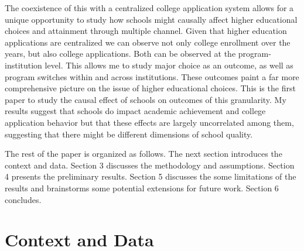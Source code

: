 \documentclass[12pt]{article}
\begin{document}
The coexistence of this with a centralized college application system  allows for a unique opportunity to study how schools might causally affect higher educational choices and attainment through multiple channel. Given that higher education applications are centralized we can observe not only college enrollment over the years, but also college applications. Both can be observed at the program-institution level. This allows me to study major choice as an outcome, as well as program switches within and across institutions. These outcomes paint a far more comprehensive picture on the issue of higher educational choices. This is the first paper to study the causal effect of schools on outcomes of this granularity. My results suggest that schools do impact academic achievement and college application behavior but that these effects are largely uncorrelated among them, suggesting that there might be different dimensions of school quality. 


The rest of the paper is organized as follows. The next section introduces the context and data. Section 3 discusses the methodology and assumptions. Section 4 presents the preliminary results. Section 5 discusses the some limitations of the results and brainstorms some potential extensions for future work. Section 6 concludes. 



\clearpage
\section{Context and Data}






\end{document}
